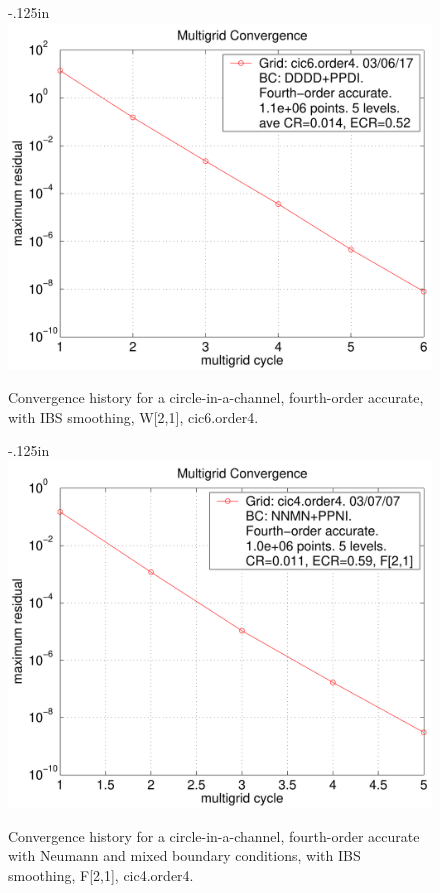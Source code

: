 \documentclass{article}
\begin{document}
\begin{figure}[hbt]
\begin{center}
\vglue-.125in
\includegraphics[width=\figWidth]{fig/residual-cic6-order4}
\end{center}
\caption{Convergence history for a circle-in-a-channel, fourth-order accurate, with IBS smoothing, W[2,1], cic6.order4.}
\label{fig:square1024}
\end{figure}


\begin{figure}[hbt]
\begin{center}
\vglue-.125in
\includegraphics[width=\figWidth]{fig/residual-cic4-mixed-order4}
\end{center}
\caption{Convergence history for a circle-in-a-channel, fourth-order accurate with Neumann and mixed boundary
conditions, with IBS smoothing, F[2,1], cic4.order4.}
\label{fig:square1024}
\end{figure}
\end{document}
